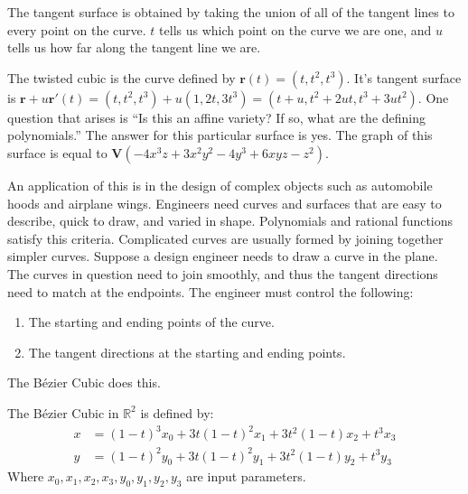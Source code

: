                 \begin{remark}
                    The tangent surface is obtained by
                    taking the union of all of the tangent
                    lines to every point on the curve.
                    $t$ tells us which point on the curve we are
                    one, and $u$ tells us how far along the
                    tangent line we are.
                \end{remark}
                \begin{example}
                    The twisted cubic is the curve defined by
                    $\mathbf{r}(t)=(t,t^2,t^3)$. It's tangent surface is
                    $\mathbf{r}+u\mathbf{r}'(t)%
                     =(t,t^2,t^3)+u(1,2t,3t^3)%
                     =(t+u,t^2+2ut,t^3+3ut^2)$.
                    One question that arises is
                    ``Is this an affine variety? If so,
                    what are the defining polynomials.''
                    The answer for this particular surface is yes.
                    The graph of this surface is equal to
                    $\mathbf{V}(-4x^3z+3x^2y^2-4y^3+6xyz-z^2)$.
                \end{example}
                An application of this is in the design of
                complex objects such as automobile hoods and
                airplane wings. Engineers need curves and surfaces
                that are easy to describe, quick to draw, and varied
                in shape. Polynomials and rational functions satisfy
                this criteria. Complicated curves are usually
                formed by joining together simpler curves. Suppose
                a design engineer needs to draw a curve in the plane.
                The curves in question need to join smoothly, and
                thus the tangent directions need to match at the
                endpoints. The engineer must control the following:
                \begin{enumerate}
                    \item The starting and ending
                          points of the curve.
                    \item The tangent directions
                          at the starting and ending points.
                \end{enumerate}
                The B\'{e}zier Cubic does this.
                \begin{definition}
                    The B\'{e}zier Cubic in $\mathbb{R}^2$
                    is defined by:
                    \begin{align*}
                        x&=(1-t)^{3}x_0
                          +3t(1-t)^2x_1
                          +3t^2(1-t)x_2+t^3x_3\\
                        y&=(1-t)^{2}y_0
                          +3t(1-t)^2y_1
                          +3t^2(1-t)y_2+t^3y_3
                    \end{align*}
                    Where $x_0,x_1,x_2,x_3,y_0,y_1,y_2,y_3$
                    are input parameters.
                \end{definition}
